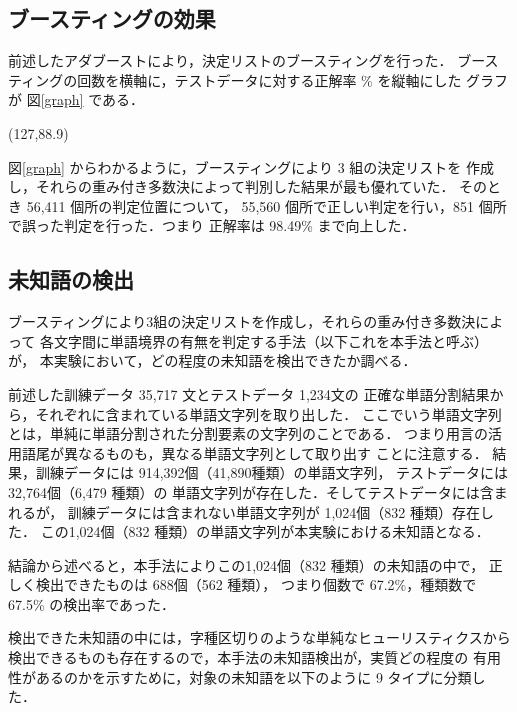 \subsection{ブースティングの効果}

前述したアダブーストにより，決定リストのブースティングを行った．
ブースティングの回数を横軸に，テストデータに対する正解率 \% を縦軸にした
グラフが \mbox{図\ref{graph}} である．

\begin{figure*}[htbp]
\begin{center}
\atari(127,88.9)
\end{center}
\caption{ブースティングによる正解率}
\label{graph}
\end{figure*}

\mbox{図\ref{graph}} からわかるように，ブースティングにより 3 組の決定リストを
作成し，それらの重み付き多数決によって判別した結果が最も優れていた．
そのとき 56,411 個所の判定位置について，
55,560 個所で正しい判定を行い，851 個所で誤った判定を行った．つまり
正解率は 98.49\% まで向上した．

\subsection{未知語の検出}

ブースティングにより3組の決定リストを作成し，それらの重み付き多数決によって
各文字間に単語境界の有無を判定する手法（以下これを本手法と呼ぶ）が，
本実験において，どの程度の未知語を検出できたか調べる．

前述した訓練データ 35,717 文とテストデータ 1,234文の
正確な単語分割結果から，それぞれに含まれている単語文字列を取り出した．
ここでいう単語文字列とは，単純に単語分割された分割要素の文字列のことである．
つまり用言の活用語尾が異なるものも，異なる単語文字列として取り出す
ことに注意する．
結果，訓練データには 914,392個（41,890種類）の単語文字列，
テストデータには 32,764個（6,479 種類）の
単語文字列が存在した．そしてテストデータには含まれるが，
訓練データには含まれない単語文字列が 1,024個（832 種類）存在した．
この1,024個（832 種類）の単語文字列が本実験における未知語となる．

結論から述べると，本手法によりこの1,024個（832 種類）の未知語の中で，
正しく検出できたものは 688個（562 種類），
つまり個数で 67.2\%，種類数で 67.5\% の検出率であった．

検出できた未知語の中には，字種区切りのような単純なヒューリスティクスから
検出できるものも存在するので，本手法の未知語検出が，実質どの程度の
有用性があるのかを示すために，対象の未知語を以下のように 9 タイプに分類した．


